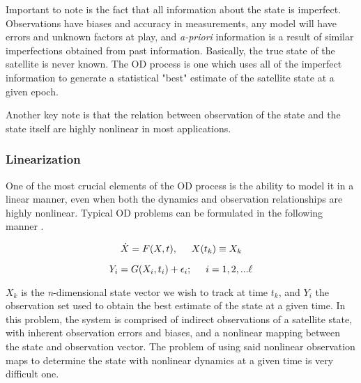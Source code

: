 \documentclass[12pt,a4paper,oneside]{article}
\numberwithin{equation}{section}   		%
\begin{document}
Important to note is the fact that all information about the state is imperfect. Observations have biases and accuracy in measurements, any model will have errors and unknown factors at play, and \emph{a-priori} information is a result of similar imperfections obtained from past information. Basically, the true state of the satellite is never known. The OD process is one which uses all of the imperfect information to generate a statistical "best" estimate of the satellite state at a given epoch. 

Another key note is that the relation between observation of the state and the state itself are highly nonlinear in most applications. 




\subsubsection{Linearization}
\label{sec:OD sub Linearization}
One of the most crucial elements of the OD process is the ability to model it in a linear manner, even when both the dynamics and observation relationships are highly nonlinear. Typical OD problems can be formulated in the following manner \cite{tapley2004statistical}. 

\begin{equation}
	\dot{X} = F(X,t), \hspace{0.5cm}     X(t_k) \equiv X_k
	\label{eq:FX}
\end{equation}
	
\begin{equation}
	Y_i = G(X_i,t_i) + \epsilon_i ; \hspace{0.5cm}   i=1,2,...\ell
	\label{eq:Yi}
\end{equation}

$X_k$ is the \emph{n}-dimensional state vector we wish to track at time $t_k$, and  $Y_i$ the observation set used to obtain the best estimate of the state at a given time. In this problem, the system is comprised of indirect observations of a satellite state, with inherent observation errors and biases, and a nonlinear mapping between the state and observation vector. The problem of using said nonlinear observation maps to determine the state with nonlinear dynamics at a given time is very difficult one. 
\end{document}
